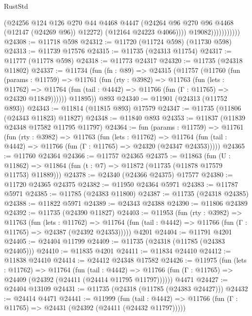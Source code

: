 \begin{lexlean}{RustStd}
\begin{coremodule}
                              (@24256
                                @124
                                @126
                                @270
                                @44
                                @4468
                                @4447
                                (@24264 @96 @270 @96 @4468 (@12147 (@24269 @96)) @12272)
                                (@12164 @24223 @4066))))
                          @19082)))))))))))
@24308 := @11718 @598
@24312 := @11720 (@11724 @598) (@11730 @598)
@24313 := @11739 @17576
@24315 := @11735 (@24313 @11754)
@24317 := @11777 (@11778 @598)
@24318 := @11773 @24317
@24320 := @11735 (@24318 @11802)
@24337 := @11734
    (fun (fn : @89) =>
    @24315
      (@11757
        (@11760
          (fun (params : @11759) =>
          @11761
            (fun (rty : @3982) =>
            @11763
              (fun (lets : @11762) =>
              @11764 (fun (tail : @4442) => @11766 (fun (Γ : @11765) => @24320 @11849))))))
        @11895))
    @893
@24340 := @11901 (@24313 (@11752 @893))
@24343 := @11814 (@11815 @893) @17579
@24347 := @11735 (@11806 (@24343 @11823) @11827)
@24348 := @11840 @893
@24353 := @11837 (@11839 @24348 @17582 @11795 @11797)
@24364 := fun (params : @11759) =>
  @11761
    (fun (rty : @3982) =>
    @11763
      (fun (lets : @11762) =>
      @11764 (fun (tail : @4442) => @11766 (fun (Γ : @11765) => @24320 (@24347 @24353)))))
@24365 := @11760 @24364
@24366 := @11757 @24365
@24375 := @11863
    (fun (U : @11862) => @11864 (fun (t : @7) => @11872 (@11735 (@11878 @17579 @11753) @11889)))
@24378 := @24340 (@24366 @24375) @17577
@24380 := @11720 @24365 @24375
@24382 := @11950 @24364 @5971
@24383 := @11787 @5971
@24385 := @11785 (@24383 @11800)
@24387 := @11735 (@24318 @24385)
@24388 := @11822 @5971
@24389 := @24343 @24388
@24390 := @11806 @24389
@24392 := @11735 (@24390 @11827)
@24403 := @11953
    (fun (rty : @3982) =>
    @11763
      (fun (lets : @11762) =>
      @11764 (fun (tail : @4442) => @11766 (fun (Γ : @11765) => @24387 (@24392 @24353)))))
    @4201
@24404 := @11791 @4201
@24405 := @24404 @11799
@24409 := @11735 (@24318 (@11785 (@24383 @24405)))
@24410 := @11835 @4201
@24411 := @11834 @24410
@24412 := @11838 @24410
@24414 := @24412 @24348 @17582
@24426 := @11975
    (fun (lets : @11762) =>
    @11764
      (fun (tail : @4442) =>
      @11766 (fun (Γ : @11765) => @24409 (@24392 (@24411 (@24414 @11795 @11797))))))
    @4471
@24427 := @24404 @13109
@24431 := @11735 (@24318 (@11785 (@24383 @24427)))
@24432 := @24414 @4471
@24441 := @11999
    (fun (tail : @4442) => @11766 (fun (Γ : @11765) => @24431 (@24392 (@24411 (@24432 @11797)))))

\end{coremodule}
\end{lexlean}

